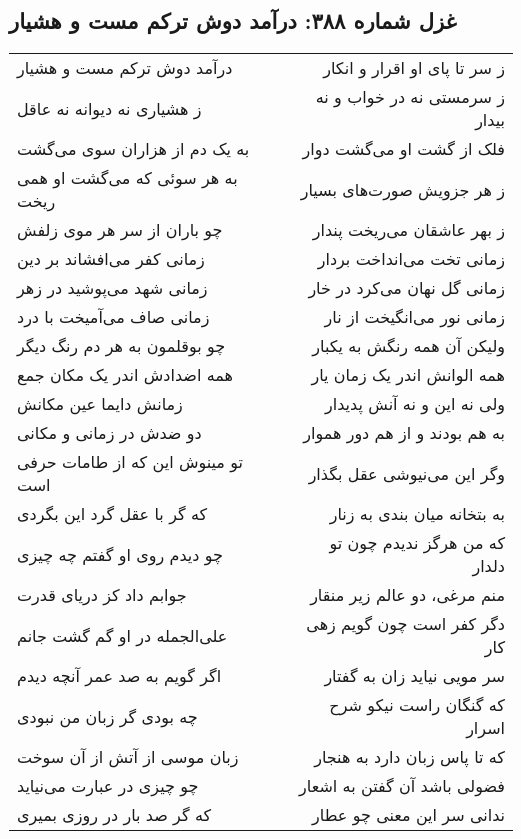 \begin{center}
\section*{غزل شماره ۳۸۸: درآمد دوش ترکم مست و هشیار}
\label{sec:388}
\begin{longtable}{l p{0.5cm} r}
درآمد دوش ترکم مست و هشیار
&&
ز سر تا پای او اقرار و انکار
\\
ز هشیاری نه دیوانه نه عاقل
&&
ز سرمستی نه در خواب و نه بیدار
\\
به یک دم از هزاران سوی می‌گشت
&&
فلک از گشت او می‌گشت دوار
\\
به هر سوئی که می‌گشت او همی ریخت
&&
ز هر جزویش صورت‌های بسیار
\\
چو باران از سر هر موی زلفش
&&
ز بهر عاشقان می‌ریخت پندار
\\
زمانی کفر می‌افشاند بر دین
&&
زمانی تخت می‌انداخت بردار
\\
زمانی شهد می‌پوشید در زهر
&&
زمانی گل نهان می‌کرد در خار
\\
زمانی صاف می‌آمیخت با درد
&&
زمانی نور می‌انگیخت از نار
\\
چو بوقلمون به هر دم رنگ دیگر
&&
ولیکن آن همه رنگش به یکبار
\\
همه اضدادش اندر یک مکان جمع
&&
همه الوانش اندر یک زمان یار
\\
زمانش دایما عین مکانش
&&
ولی نه این و نه آنش پدیدار
\\
دو ضدش در زمانی و مکانی
&&
به هم بودند و از هم دور هموار
\\
تو مینوش این که از طامات حرفی است
&&
وگر این می‌نیوشی عقل بگذار
\\
که گر با عقل گرد این بگردی
&&
به بتخانه میان بندی به زنار
\\
چو دیدم روی او گفتم چه چیزی
&&
که من هرگز ندیدم چون تو دلدار
\\
جوابم داد کز دریای قدرت
&&
منم مرغی، دو عالم زیر منقار
\\
علی‌الجمله در او گم گشت جانم
&&
دگر کفر است چون گویم زهی کار
\\
اگر گویم به صد عمر آنچه دیدم
&&
سر مویی نیاید زان به گفتار
\\
چه بودی گر زبان من نبودی
&&
که گنگان راست نیکو شرح اسرار
\\
زبان موسی از آتش از آن سوخت
&&
که تا پاس زبان دارد به هنجار
\\
چو چیزی در عبارت می‌نیاید
&&
فضولی باشد آن گفتن به اشعار
\\
که گر صد بار در روزی بمیری
&&
ندانی سر این معنی چو عطار
\\
\end{longtable}
\end{center}
